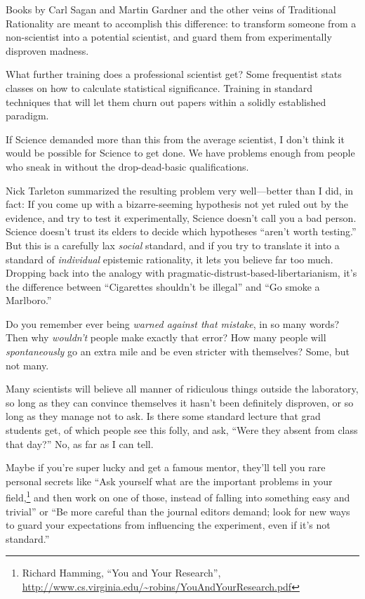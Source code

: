 {
 Books by Carl Sagan and Martin Gardner and the other veins of
Traditional Rationality are meant to accomplish this difference: to
transform someone from a non-scientist into a potential scientist, and
guard them from experimentally disproven madness.}

{
 What further training does a professional scientist get? Some
frequentist stats classes on how to calculate statistical significance.
Training in standard techniques that will let them churn out papers
within a solidly established paradigm.}

{
 If Science demanded more than this from the average scientist, I
don't think it would be possible for Science to get
done. We have problems enough from people who sneak in without the
drop-dead-basic qualifications.}

{
 Nick Tarleton summarized the resulting problem very well---better
than I did, in fact: If you come up with a bizarre-seeming hypothesis
not yet ruled out by the evidence, and try to test it experimentally,
Science doesn't call you a bad person. Science
doesn't trust its elders to decide which hypotheses
``aren't worth
testing.'' But this is a carefully lax
\textit{social} standard, and if you try to translate it into a
standard of \textit{individual} epistemic rationality, it lets you
believe far too much. Dropping back into the analogy with
pragmatic-distrust-based-libertarianism, it's the
difference between ``Cigarettes
shouldn't be illegal'' and
``Go smoke a Marlboro.''}

{
 Do you remember ever being \textit{warned against that mistake},
in so many words? Then why \textit{wouldn't} people
make exactly that error? How many people will \textit{spontaneously} go
an extra mile and be even stricter with themselves? Some, but not
many.}

{
 Many scientists will believe all manner of ridiculous things
outside the laboratory, so long as they can convince themselves it
hasn't been definitely disproven, or so long as they
manage not to ask. Is there some standard lecture that grad students
get, of which people see this folly, and ask, ``Were
they absent from class that day?'' No, as far as I
can tell.}

{
 Maybe if you're super lucky and get a famous
mentor, they'll tell you rare personal secrets like
``Ask yourself what are the important problems in
your field,\footnote{Richard Hamming, ``You and Your Research'', \url{http://www.cs.virginia.edu/~robins/YouAndYourResearch.pdf}} and then work on one of those, instead of falling into
something easy and trivial'' or ``Be
more careful than the journal editors demand; look for new ways to
guard your expectations from influencing the experiment, even if
it's not standard.''}

